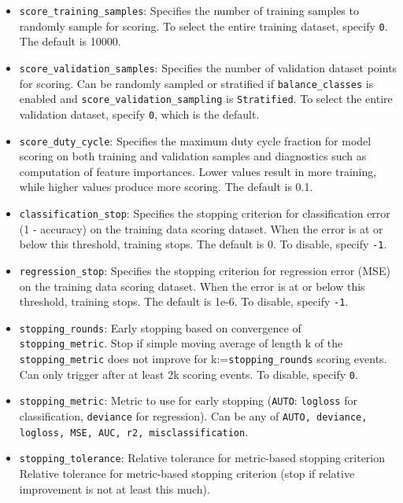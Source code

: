 {{\begin{itemize}
\item \texttt{score\_training\_samples}: Specifies the number of training samples to randomly sample for scoring. To select the entire training dataset, specify \texttt{0}.  The default is 10000.

\item \texttt{score\_validation\_samples}: Specifies the number of validation dataset points for scoring. Can be randomly sampled or stratified if  \texttt{balance\_classes} is enabled and \texttt{score\_validation\_sampling} is \texttt{Stratified}. To select the entire validation dataset, specify \texttt{0}, which is the default.

\item \texttt{score\_duty\_cycle}: Specifies the maximum duty cycle fraction for model scoring on both training and validation samples and diagnostics such as computation of feature importances. Lower values result in more training, while higher values produce more scoring. The default is 0.1.

\item \texttt{classification\_stop}: Specifies the stopping criterion for classification error (1 - accuracy) on the training data scoring dataset.  When the error is at or below this threshold, training stops.  The default is 0.  To disable, specify \texttt{-1}. 

\item \texttt{regression\_stop}: Specifies the stopping criterion for regression error (MSE) on the training data scoring dataset. When the error is at or below this threshold, training stops. The default is 1e-6.  To disable, specify \texttt{-1}.

\item \texttt{stopping\_rounds}: Early stopping based on convergence of \\\texttt{stopping\_metric}. Stop if simple moving average of length k of the \texttt{stopping\_metric} does not improve for k:=\texttt{stopping\_rounds} scoring events. Can only trigger after at least 2k scoring events. To disable, specify \texttt{0}.

\item \texttt{stopping\_metric}: Metric to use for early stopping (\texttt{AUTO}: \texttt{logloss} for classification, \texttt{deviance} for regression). Can be any of \texttt{AUTO, deviance, logloss, MSE, AUC, r2, misclassification}.

\item \texttt{stopping\_tolerance}: Relative tolerance for metric-based stopping criterion Relative tolerance for metric-based stopping criterion (stop if relative improvement is not at least this much).


\end{itemize}}}
